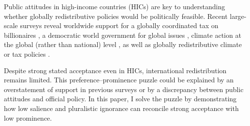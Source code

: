 \documentclass[12pt,english]{article}
\begin{document}
\begin{bibunit}
Public attitudes in high-income countries (HICs) are key to understanding whether globally redistributive policies would be politically feasible. 
Recent large-scale surveys reveal worldwide 
support for a globally coordinated tax on billionaires \citep{cappelen_majority_2025}, %
a democratic world government for global issues \citep{ghassim_who_2024}, climate action at the global (rather than national) level \citep{dechezlepretre_fighting_2025}, %
as well as globally redistributive climate or tax policies \citep{fabre_majority_2025}. 

Despite strong stated acceptance even in HICs, international redistribution remains limited. 
This preference--prominence puzzle could be explained by an overstatement of support in previous surveys or by a discrepancy between public attitudes and official policy. %
In this paper, I solve the puzzle by demonstrating how low salience and pluralistic ignorance can reconcile strong acceptance with low prominence. 


\end{bibunit}
\end{document}
